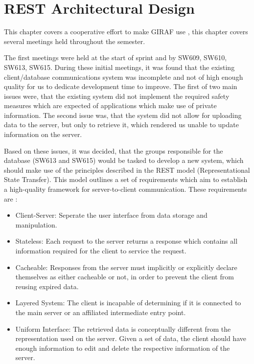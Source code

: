 \chapter{REST Architectural Design}\label{S1CS}
This chapter covers a cooperative effort to make GIRAF use , this
chapter covers several meetings held throughout the semester.\nl

The first meetings were held at the start of sprint and by SW609, SW610, SW613,
SW615. During these initial meetings, it was found that the existing
client/database communications system was incomplete and not of high enough
quality for us to dedicate development time to improve. The first of two main
issues were, that the existing system did not implement the required safety
measures which are expected of applications which make use of private
information. The second issue was, that the system did not allow for uploading
data to the server, but only to retrieve it, which rendered us unable to update
information on the server.\nl

Based on these issues, it was decided, that the groups responsible for the
database (SW613 and SW615) would be tasked to develop a new system, which should
make use of the principles described in the REST model (Representational State
Transfer)\citep{RESTInfo}. This model outlines a set of requirements which aim
to establish a high-quality framework for server-to-client communication. These
requirements are \citep{RESTInfo}:

\begin{itemize}
  \item Client-Server: Seperate the user interface from data storage and
  manipulation.
  \item Stateless: Each request to the server returns a response which contains
  all information required for the client to service the request.
  \item Cacheable: Responses from the server must implicitly or explicitly
  declare themselves as either cacheable or not, in order to prevent the client
  from reusing expired data.
  \item Layered System: The client is incapable of determining if it is connected
  to the main server or an affiliated intermediate entry point.
  \item Uniform Interface: The retrieved data is conceptually different from the
  representation used on the server. Given a set of data, the client should have
  enough information to edit and delete the respective information of the
  server. 
\end{itemize}

